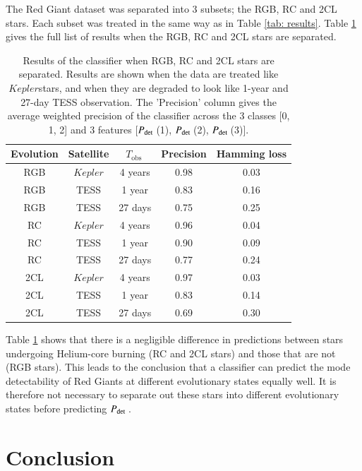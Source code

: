 \documentclass[a4paper,fleqn,usenatbib,useAMS]{mnras}
\newcommand{\kep}{\ensuremath{Kepler}\:}
\newcommand{\pdet}{\ensuremath{P_{\rm det}\:}}
\newcommand{\tobs}{\ensuremath{T_{\textrm{obs}}\:}}
\begin{document}
The Red Giant dataset was separated into 3 subsets; the RGB, RC and 2CL stars. Each subset was treated in the same way as in Table \ref{tab: results}. Table \ref{tab: evo results} gives the full list of results when the RGB, RC and 2CL stars are separated. 
\begin{table}
\begin{center}
\begin{tabular}{ |c|c|c|c|c| }
Evolution & Satellite & \tobs   & Precision & Hamming loss \\
\hline
RGB       & \kep      & 4 years & 0.98      & 0.03         \\
RGB       & TESS      & 1 year  & 0.83      & 0.16         \\
RGB       & TESS      & 27 days & 0.75      & 0.25         \\
\hline
RC        & \kep      & 4 years & 0.96      & 0.04         \\
RC        & TESS      & 1 year  & 0.90      & 0.09         \\
RC        & TESS      & 27 days & 0.77      & 0.24         \\
\hline
2CL       & \kep      & 4 years & 0.97      & 0.03         \\
2CL       & TESS      & 1 year  & 0.83      & 0.14         \\
2CL       & TESS      & 27 days & 0.69      & 0.30         \\
\end{tabular}
\end{center}
\caption{Results of the classifier when RGB, RC and 2CL stars are separated. Results are shown when the data are treated like \kep stars, and when they are degraded to look like 1-year and 27-day TESS observation. The 'Precision' column gives the average weighted precision of the classifier across the 3 classes [0, 1, 2] and 3 features [\pdet(1), \pdet(2), \pdet(3)].}
\label{tab: evo results}
\end{table}

Table \ref{tab: evo results} shows that there is a negligible difference in predictions between stars undergoing Helium-core burning (RC and 2CL stars) and those that are not (RGB stars). This leads to the conclusion that a classifier can predict the mode detectability of Red Giants at different evolutionary states equally well. It is therefore not necessary to separate out these stars into different evolutionary states before predicting \pdet.


\section{Conclusion}
\label{sect: conc}
\end{document}
